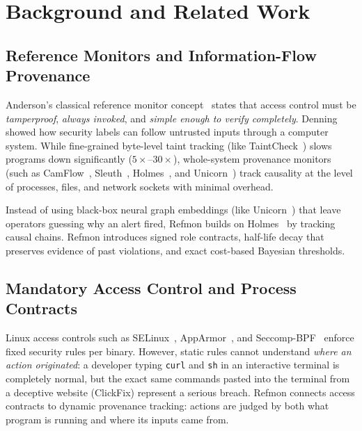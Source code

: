 \documentclass[10pt,twocolumn,letterpaper]{article}
\makeatletter
\theoremstyle{plain}
\theoremstyle{definition}
\theoremstyle{remark}
\DeclareRobustCommand{\_}{\ifmmode\nfss@text{\textunderscore}\else\textunderscore\penalty\@highpenalty\hskip\z@skip\fi}
\makeatother
\begin{document}
\section{Background and Related Work}
\label{sec:related}

\subsection{Reference Monitors and Information-Flow Provenance}
Anderson's classical reference monitor concept~\cite{anderson1972computer} states that access control must be \emph{tamperproof}, \emph{always invoked}, and \emph{simple enough to verify completely}. Denning~\cite{denning1976lattice} showed how security labels can follow untrusted inputs through a computer system. While fine-grained byte-level taint tracking (like TaintCheck~\cite{newsome2005dynamic}) slows programs down significantly ($5\times$--$30\times$), whole-system provenance monitors (such as CamFlow~\cite{pasquier2017practical}, Sleuth~\cite{hossain2017sleuth}, Holmes~\cite{milajerdi2019holmes}, and Unicorn~\cite{han2020unicorn}) track causality at the level of processes, files, and network sockets with minimal overhead.

Instead of using black-box neural graph embeddings (like Unicorn~\cite{han2020unicorn}) that leave operators guessing why an alert fired, Refmon builds on Holmes~\cite{milajerdi2019holmes} by tracking causal chains. Refmon introduces signed role contracts, half-life decay that preserves evidence of past violations, and exact cost-based Bayesian thresholds.

\subsection{Mandatory Access Control and Process Contracts}
Linux access controls such as SELinux~\cite{smalley2001implementing}, AppArmor~\cite{bauer2006paranoid}, and Seccomp-BPF~\cite{corbet2012seccomp} enforce fixed security rules per binary. However, static rules cannot understand \emph{where an action originated}: a developer typing \texttt{curl} and \texttt{sh} in an interactive terminal is completely normal, but the exact same commands pasted into the terminal from a deceptive website (ClickFix) represent a serious breach. Refmon connects access contracts to dynamic provenance tracking: actions are judged by both what program is running and where its inputs came from.
\end{document}
